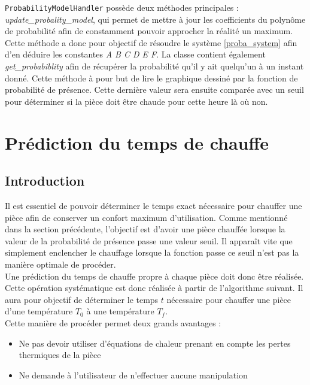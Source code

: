 \documentclass[11pt,a4paper,11pt]{report}
\begin{document}
\texttt{ProbabilityModelHandler} possède deux méthodes principales : \textit{update\_probality\_model}, qui permet de mettre à jour les coefficients du polynôme de probabilité afin de constamment pouvoir approcher la réalité un maximum. Cette méthode a donc pour objectif de résoudre le système \ref{proba_system} afin d'en déduire les constantes \textit{A B C D E F}. La classe contient également \textit{get\_probabiblity} afin de récupérer la probabilité qu'il y ait quelqu'un à un instant donné. Cette méthode à pour but de \og lire le graphique \fg dessiné par la fonction de probabilité de présence. Cette dernière valeur sera ensuite comparée avec un seuil pour déterminer si la pièce doit être chaude pour cette heure là où non.\\

\section{Prédiction du temps de chauffe}

\subsection{Introduction}

Il est essentiel de pouvoir déterminer le temps exact nécessaire pour chauffer une pièce afin de conserver un confort maximum d'utilisation. Comme mentionné dans la section précédente, l'objectif est d'avoir une pièce chauffée lorsque la valeur de la probabilité de présence passe une valeur seuil. Il apparaît vite que \og simplement \fg enclencher le chauffage lorsque la fonction passe ce seuil n'est pas la manière optimale de procéder.\\

Une prédiction du temps de chauffe propre à chaque pièce doit donc être réalisée. Cette opération systématique est donc réalisée à partir de l'algorithme suivant. Il aura pour objectif de déterminer le temps $t$ nécessaire pour chauffer une pièce d'une température $T_0$ à une température $T_f$.\\

Cette manière de procéder permet deux grands avantages :\\
\begin{itemize}
\item Ne pas devoir utiliser d'équations de chaleur prenant en compte les pertes thermiques de la pièce
\item Ne demande à l'utilisateur de n'effectuer aucune manipulation
\end{itemize}
\end{document}
